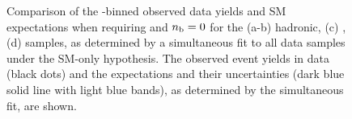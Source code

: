 \begin{figure}[t!]
\begin{center}
{    } 
    \caption{\label{fig:best-fit-ge4j0b} Comparison of the
      \scalht-binned observed data yields and SM expectations when
      requiring \njethigh and $n_{\text{b}} = 0$ for the (a-b) hadronic, (c)
      \mj, (d) \gj samples, as determined by a
      simultaneous fit to all data samples under the SM-only
      hypothesis. The observed event yields in data (black dots) and
      the expectations and their uncertainties (dark blue solid line
      with light blue bands), as determined by the simultaneous fit,
      are shown. 
      }
  \end{center}
\end{figure}

